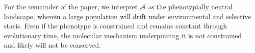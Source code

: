 \documentclass{article}
\newcommand{\plr}[1]{\todo[color=blue!25]{#1}}
\newcommand{\plr}[1]{{\color{blue}\it #1}}
\newcommand{\1}{\mathbbm{1}}
\newcommand{\allS}{\mathcal{A}}
\begin{document}
For the remainder of the paper, we interpret $\allS$ as the phenotypially neutral landscape, wherein a large population will drift under environmental and selective stasis. Even if the phenotype is constrained and remains constant through evolutionary time, the molecular mechanism underpinning it is not constrained and likely will not be conserved.



\end{document}
